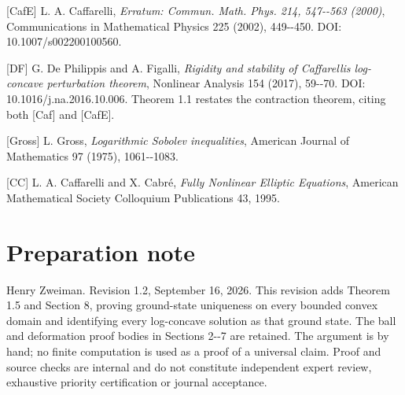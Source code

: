 \documentclass[11pt]{article}
\begin{document}
{[}CafE{]} L. A. Caffarelli, \emph{Erratum: Commun. Math. Phys. 214,
547-\/-563 (2000)}, Communications in Mathematical Physics 225 (2002),
449-\/-450. DOI: 10.1007/s002200100560.

{[}DF{]} G. De Philippis and A. Figalli, \emph{Rigidity and stability of
Caffarelli\textquotesingle s log-concave perturbation theorem},
Nonlinear Analysis 154 (2017), 59-\/-70. DOI: 10.1016/j.na.2016.10.006.
Theorem 1.1 restates the contraction theorem, citing both {[}Caf{]} and
{[}CafE{]}.

{[}Gross{]} L. Gross, \emph{Logarithmic Sobolev inequalities}, American
Journal of Mathematics 97 (1975), 1061-\/-1083.

{[}CC{]} L. A. Caffarelli and X. Cabré, \emph{Fully Nonlinear Elliptic
Equations}, American Mathematical Society Colloquium Publications 43,
1995.

\section{Preparation note}\label{preparation-note}

Henry Zweiman. Revision 1.2, September 16, 2026. This revision adds
Theorem 1.5 and Section 8, proving ground-state uniqueness on every
bounded convex domain and identifying every log-concave solution as that
ground state. The ball and deformation proof bodies in Sections 2-\/-7
are retained. The argument is by hand; no finite computation is used as
a proof of a universal claim. Proof and source checks are internal and
do not constitute independent expert review, exhaustive priority
certification or journal acceptance.
\end{document}
